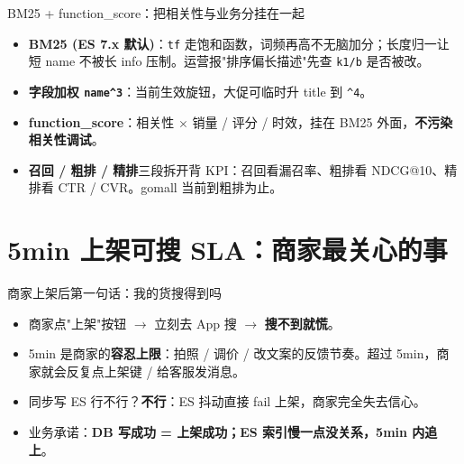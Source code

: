 \documentclass[aspectratio=169,11pt]{beamer}
\begin{document}
\begin{frame}[shrink]{BM25 + function\_score：把相关性与业务分挂在一起}
\begin{itemize}
  \item \textbf{BM25 (ES 7.x 默认)}：\texttt{tf} 走饱和函数，词频再高不无脑加分；长度归一让短 name 不被长 info 压制。运营报"排序偏长描述"先查 \texttt{k1/b} 是否被改。
  \item \textbf{字段加权 \texttt{name\^{}3}}：当前生效旋钮，大促可临时升 title 到 \texttt{\^{}4}。
  \item \textbf{function\_score}：相关性 $\times$ 销量 / 评分 / 时效，挂在 BM25 外面，\textbf{不污染相关性调试}。
  \item \textbf{召回 / 粗排 / 精排}三段拆开背 KPI：召回看漏召率、粗排看 NDCG@10、精排看 CTR / CVR。gomall 当前到粗排为止。
\end{itemize}
\end{frame}

\section{5min 上架可搜 SLA：商家最关心的事}

\begin{frame}[shrink]{商家上架后第一句话：我的货搜得到吗}
\begin{itemize}
  \item 商家点"上架"按钮 $\to$ 立刻去 App 搜 $\to$ \textbf{搜不到就慌}。
  \item 5min 是商家的\textbf{容忍上限}：拍照 / 调价 / 改文案的反馈节奏。超过 5min，商家就会反复点上架键 / 给客服发消息。
  \item 同步写 ES 行不行？\textbf{不行}：ES 抖动直接 fail 上架，商家完全失去信心。
  \item 业务承诺：\textbf{DB 写成功 = 上架成功；ES 索引慢一点没关系，5min 内追上}。
\end{itemize}
\end{frame}
\end{document}
